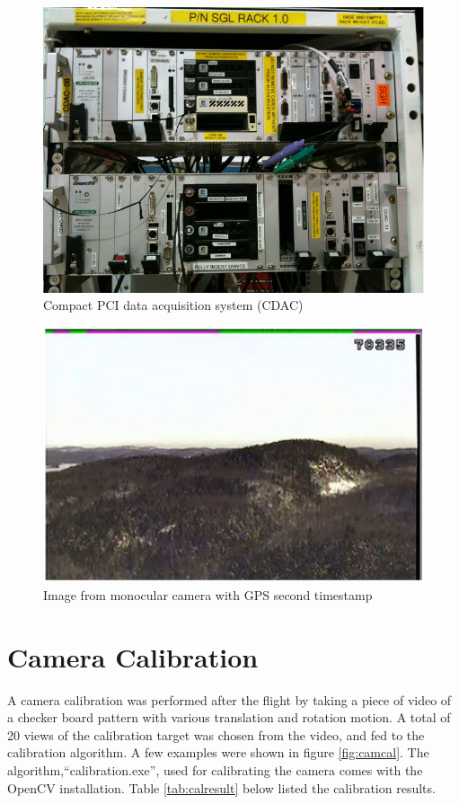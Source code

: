 \begin{figure}[h]
  \centering
  \includegraphics[width=12cm,keepaspectratio=true]{./Figures/CDAC_Rack.jpg}
  \caption{Compact PCI data acquisition system (CDAC)}
  \label{fig:CDAC}
\end{figure}

\begin{figure}[h]
  \centering
  \includegraphics[width=12cm,keepaspectratio=true]{./Figures/video_snapshot.jpg}
  \caption{Image from monocular camera with GPS second timestamp}
  \label{fig:video_snapshot}
\end{figure}

\section{Camera Calibration}

A camera calibration was performed after the flight by taking a piece
of video of a checker board pattern with various translation and
rotation motion. A total of 20 views of the calibration target was
chosen from the video, and fed to the calibration algorithm. A few
examples were shown in figure \ref{fig:camcal}. The
algorithm,``calibration.exe'', used for calibrating the camera comes
with the OpenCV installation. Table \ref{tab:calresult} below listed
the calibration results.

